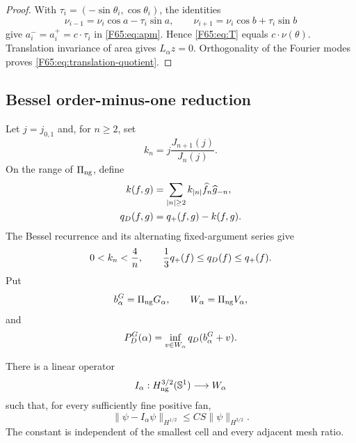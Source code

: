 \begin{proof}
With $\tau_i=(-\sin\theta_i,\cos\theta_i)$, the identities
\begin{equation}
 \nu_{i-1}=\nu_i\cos a-\tau_i\sin a,
 \qquad
 \nu_{i+1}=\nu_i\cos b+\tau_i\sin b
\end{equation}
give $a_i^-=a_i^+=c\cdot\tau_i$ in \eqref{F65:eq:apm}.  Hence
\eqref{F65:eq:T} equals $c\cdot\nu(\theta)$.  Translation invariance of area
gives $L_\alpha z=0$.  Orthogonality of the Fourier modes proves
\eqref{F65:eq:translation-quotient}.
\end{proof}

\subsection{Bessel order-minus-one reduction}

Let $j=j_{0,1}$ and, for $n\ge2$, set
\begin{equation}
 k_n=j\frac{J_{n+1}(j)}{J_n(j)}.
\end{equation}
On the range of $\Pi_{\rm ng}$, define
\begin{align}
 k(f,g)&=\sum_{|n|\ge2}k_{|n|}\widehat f_n\widehat g_{-n},\notag\\
 q_D(f,g)&=q_+(f,g)-k(f,g).
 \label{F65:eq:qdisk}
\end{align}
The Bessel recurrence and its alternating fixed-argument series give
\begin{equation}\label{F65:eq:bessel-bounds}
 0<k_n<\frac4n,
 \qquad \frac13q_+(f)\le q_D(f)\le q_+(f).
\end{equation}
Put
\begin{equation}
 b_\alpha^G=\Pi_{\rm ng} G_\alpha,
 \qquad W_\alpha=\Pi_{\rm ng} V_\alpha,
\end{equation}
and
\begin{equation}\label{F65:eq:PDG}
 P_D^G(\alpha)=\inf_{v\in W_\alpha}q_D(b_\alpha^G+v).
\end{equation}

\begin{lemma}
\label{F65:lem:QI}
There is a linear operator
\begin{equation}
 I_\alpha:H_{\rm ng}^{3/2}(\mathbb S^1)\longrightarrow W_\alpha
\end{equation}
such that, for every sufficiently fine positive fan,
\begin{equation}\label{F65:eq:interpolant}
 \|\psi-I_\alpha\psi\|_{H^{1/2}}
 \le CS\|\psi\|_{H^{3/2}}.
\end{equation}
The constant is independent of the smallest cell and every adjacent
mesh ratio.
\end{lemma}

